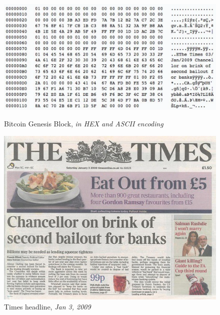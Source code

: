 \begin{figure}[h!]
    \begin{minipage}[t]{0.55\textwidth}
    \centering
    \includegraphics[width=1.1\textwidth]{Figures/bitcoin/genesis-block.png}
    \caption{Bitcoin Genesis Block, \textit{in HEX and ASCII encoding}}
    \label{fig:genesis-block}
    \end{minipage}\hfill
    \begin{minipage}[t]{0.35\textwidth}
    \centering
    \includegraphics[width=1.1\textwidth]{Figures/bitcoin/times.jpg}
    \caption{Times headline, \textit{Jan 3, 2009}}
    \label{fig:times-headline}
    \end{minipage}
\end{figure}
